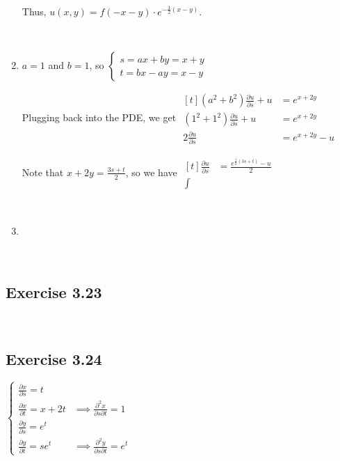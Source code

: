 \documentclass[11pt,fleqn]{book} %
\begin{document}
\begin{enumerate}
    Thus, $u(x, y) = f(-x - y) \cdot e^{-\frac{1}{2}(x - y)}$. 

    {~~~}

    \item $a = 1$ and $b = 1$, so $\begin{cases}
        s = ax + by = x + y \\ 
        t = bx - ay = x - y
    \end{cases}$

    Plugging back into the PDE, we get $\begin{aligned}[t]
        (a^2 + b^2) \frac{\partial u}{\partial s} + u & = e^{x+2y}     \\
        (1^2 + 1^2) \frac{\partial u}{\partial s} + u & = e^{x+2y}     \\
        2\frac{\partial u}{\partial s}                & = e^{x+2y} - u
    \end{aligned}$

    Note that $x + 2y = \frac{3s + t}{2}$, so we have $\begin{aligned}[t]
        \frac{\partial u}{\partial s}& = \frac{e^{\frac{1}{2}(3s+t)} - u }{2} \\
        \int 
    \end{aligned}$
    
    {~~~}

    \item 
\end{enumerate}

{~~~}

\subsection*{Exercise 3.23}

{~~~}

\subsection*{Exercise 3.24}

$\begin{cases}
    \frac{\partial x}{\partial s} = t \\
    \frac{\partial x}{\partial t} = x + 2t & \implies \frac{\partial^2 x}{\partial s \partial t} = 1 \\
    \frac{\partial y}{\partial s} = e^t \\
    \frac{\partial y}{\partial t} = se^t & \implies \frac{\partial ^2y}{\partial s \partial t} = e^t
\end{cases}$
\end{document}
